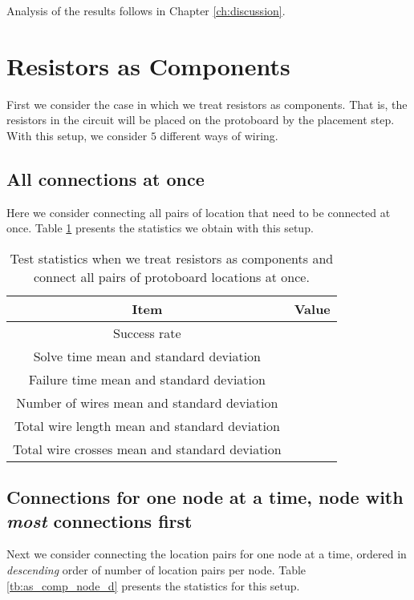 Analysis of the results follows in Chapter \ref{ch:discussion}.

\section{Resistors as Components}

First we consider the case in which we treat resistors as components. That is,
the resistors in the circuit will be placed on the protoboard by the placement
step. With this setup, we consider $5$ different ways of wiring.

\subsection{All connections at once}

Here we consider connecting all pairs of location that need to
be connected at once. Table \ref{tb:as_comp_all} presents the statistics we
obtain with this setup.

\begin{table}[H]
\begin{center}
\begin{singlespace}
\begin{tabular}{| c | c |}
\hline
Item & Value \\
\hline\hline
Success rate & \\
Solve time mean and standard deviation & \\
Failure time mean and standard deviation & \\
Number of wires mean and standard deviation & \\
Total wire length mean and standard deviation & \\
Total wire crosses mean and standard deviation & \\
\hline
\end{tabular}
\end{singlespace}
\end{center}
\label{tb:as_comp_all}
\caption{Test statistics when we treat resistors as components and connect all
pairs of protoboard locations at once.}
\end{table}

\subsection{Connections for one node at a time, node with \textit{most}
connections first}

Next we consider connecting the location pairs for one node at a time, ordered
in \textit{descending} order of number of location pairs per node. Table
\ref{tb:as_comp_node_d} presents the statistics for this setup.

